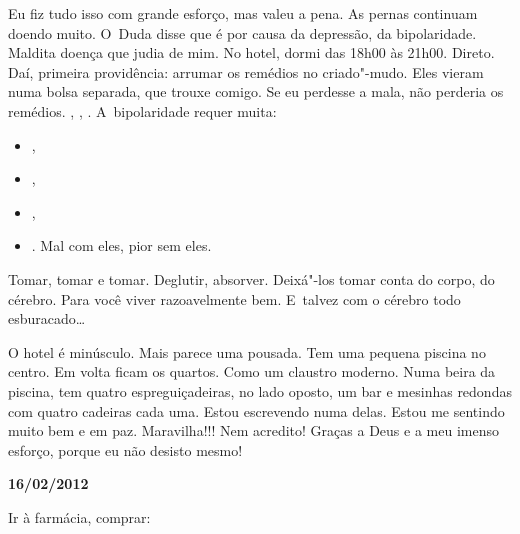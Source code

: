 Eu fiz tudo isso com grande esforço, mas valeu a pena. As pernas
continuam doendo muito. O~Duda disse que é por causa da depressão, da
bipolaridade. Maldita doença que judia de mim. No hotel, dormi das 18h00
às 21h00. Direto. Daí, primeira providência: arrumar os remédios no
criado"-mudo. Eles vieram numa bolsa separada, que trouxe comigo. Se eu
perdesse a mala, não perderia os remédios. , ,
. A~bipolaridade requer muita:

\begin{itemize}
\item
  ,
\item
  ,
\item
    ,
\item
      . Mal com eles, pior sem eles.
\end{itemize}
Tomar, tomar e tomar. Deglutir, absorver. Deixá"-los tomar conta do
corpo, do cérebro. Para você viver razoavelmente bem. E~talvez com o
cérebro todo esburacado…

O hotel é minúsculo. Mais parece uma pousada. Tem uma pequena piscina no
centro. Em volta ficam os quartos. Como um claustro moderno. Numa beira
da piscina, tem quatro espreguiçadeiras, no lado oposto, um bar e
mesinhas redondas com quatro cadeiras cada uma. Estou escrevendo numa
delas. Estou me sentindo muito bem e em paz. Maravilha!!! Nem acredito!
Graças a Deus e a meu imenso esforço, porque eu não desisto mesmo!

\begin{flushright}\textbf{}\end{flushright}

\begin{flushright}\textbf{16/02/2012}\end{flushright}


Ir à farmácia, comprar:

